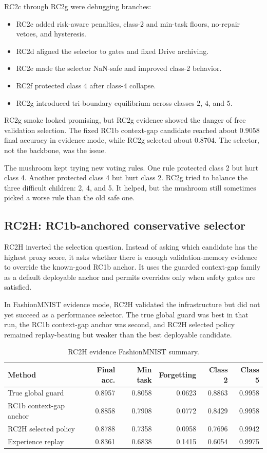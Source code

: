 \documentclass[11pt]{article}
\begin{document}
RC2c through RC2g were debugging branches:
\begin{itemize}[leftmargin=*]
  \item RC2c added risk-aware penalties, class-2 and min-task floors, no-repair vetoes, and hysteresis.
  \item RC2d aligned the selector to gates and fixed Drive archiving.
  \item RC2e made the selector NaN-safe and improved class-2 behavior.
  \item RC2f protected class 4 after class-4 collapse.
  \item RC2g introduced tri-boundary equilibrium across classes 2, 4, and 5.
\end{itemize}

RC2g smoke looked promising, but RC2g evidence showed the danger of free validation selection. The fixed RC1b context-gap candidate reached about $0.9058$ final accuracy in evidence mode, while RC2g selected about $0.8704$. The selector, not the backbone, was the issue.

\begin{kidbox}
The mushroom kept trying new voting rules. One rule protected class 2 but hurt class 4. Another protected class 4 but hurt class 2. RC2g tried to balance the three difficult children: 2, 4, and 5. It helped, but the mushroom still sometimes picked a worse rule than the old safe one.
\end{kidbox}

\subsection{RC2H: RC1b-anchored conservative selector}

RC2H inverted the selection question. Instead of asking which candidate has the highest proxy score, it asks whether there is enough validation-memory evidence to override the known-good RC1b anchor. It uses the guarded context-gap family as a default deployable anchor and permits overrides only when safety gates are satisfied.

In FashionMNIST evidence mode, RC2H validated the infrastructure but did not yet succeed as a performance selector. The true global guard was best in that run, the RC1b context-gap anchor was second, and RC2H selected policy remained replay-beating but weaker than the best deployable candidate.

\begin{table}[h]
\centering
\caption{RC2H evidence FashionMNIST summary.}
\begin{tabular}{lrrrrr}
\toprule
Method & Final acc. & Min task & Forgetting & Class 2 & Class 5 \\
\midrule
True global guard & 0.8957 & 0.8058 & 0.0623 & 0.8863 & 0.9958 \\
RC1b context-gap anchor & 0.8858 & 0.7908 & 0.0772 & 0.8429 & 0.9958 \\
RC2H selected policy & 0.8788 & 0.7358 & 0.0958 & 0.7696 & 0.9942 \\
Experience replay & 0.8361 & 0.6838 & 0.1415 & 0.6054 & 0.9975 \\
\bottomrule
\end{tabular}
\end{table}
\end{document}
